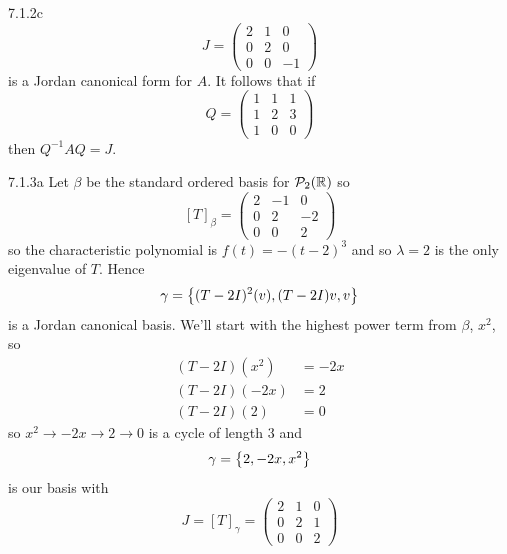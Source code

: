 \documentclass{exam}
\begin{document}
\begin{problem}{7.1.2c}
    \[
        J = \begin{pmatrix}
          2 & 1 & 0 \\
          0 & 2 & 0 \\
          0 & 0 & -1
        \end{pmatrix}
    \]
    is a Jordan canonical form for $A$. It follows that if
    \[
        Q = \begin{pmatrix}
          1 & 1 & 1 \\
          1 & 2 & 3 \\
          1 & 0 & 0
        \end{pmatrix}
    \]
    then $Q^{-1}AQ = J$.
  \end{problem}

  \begin{problem}{7.1.3a}
    Let $\beta$ be the standard ordered basis for $\mathcal{P}_2(\mathbb R)$ so 
    \[
      [T]_\beta = \begin{pmatrix}
        2 & -1 & 0 \\
        0 & 2 & -2 \\
        0 & 0 & 2
      \end{pmatrix}
    \]
    so the characteristic polynomial is $f(t) = -(t - 2)^{3}$ and so $\lambda = 2$ is the only eigenvalue of $T$. Hence 
    \[
      \gamma = \left\{(T - 2I)^2(v), (T - 2I)v, v \right\}
    \]
    is a Jordan canonical basis. We'll start with the highest power term from $\beta$, $x^2$, so
    \begin{align*}
      (T - 2I)(x^2) &= -2x \\
      (T - 2I)(-2x) &= 2 \\
      (T - 2I)(2) &= 0
    \end{align*}
    so $x^2 \to -2x \to 2 \to 0$ is a cycle of length $3$ and 
    \[
      \gamma = \left\{2, -2x, x^2 \right\}
    \]
    is our basis with 
    \[
      J = [T]_\gamma = \begin{pmatrix}
        2 & 1 & 0 \\
        0 & 2 & 1 \\
        0 & 0 & 2
      \end{pmatrix}
    \]
  \end{problem}
\end{document}
